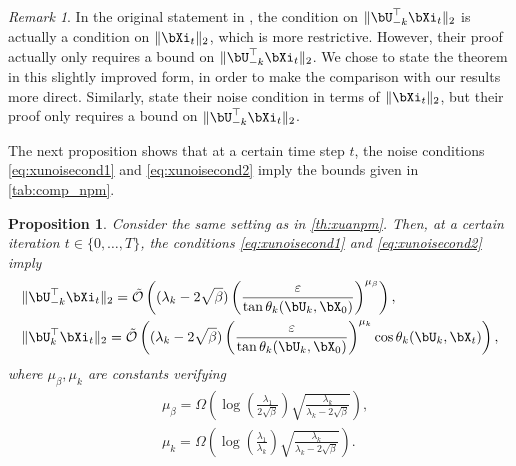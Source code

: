 \documentclass{article}
\theoremstyle{plain}
\newtheorem{proposition}[theorem]{Proposition}
\theoremstyle{definition}
\theoremstyle{remark}
\newtheorem{remark}[theorem]{Remark}
\begin{document}
\begin{remark}
  In the original statement in \cite{xu2023anpm}, the condition on $\Vert \bU_{-k}^\top\bXi_t \Vert_2$ is actually a condition on $\Vert\bXi_t\Vert_2$, which is more restrictive. However, their proof actually only requires a bound on $\Vert \bU_{-k}^\top\bXi_t \Vert_2$. We chose to state the theorem in this slightly improved form, in order to make the comparison with our results more direct. Similarly, \citet{hardt14} state their noise condition in terms of $\Vert \bXi_t \Vert_2$, but their proof only requires a bound on $\Vert \bU_{-k}^\top\bXi_t \Vert_2$.
\end{remark}

The next proposition shows that at a certain time step $t$, the noise conditions \eqref{eq:xunoisecond1} and \eqref{eq:xunoisecond2} imply the bounds given in \cref{tab:comp_npm}.

\begin{proposition}
    Consider the same setting as in \cref{th:xuanpm}. Then, at a certain iteration $t \in \{0,\dots,T\}$, the conditions \eqref{eq:xunoisecond1} and \eqref{eq:xunoisecond2} imply
    \begin{align*}
        & \Vert \bU_{-k}^\top\bXi_t \Vert_2 = \tilde{\mathcal{O}} \left( (\lambda_k - 2\sqrt{\beta}) \left(\frac{\varepsilon}{\tan\theta_k(\bU_k,\bX_0)}\right)^{\mu_\beta} \right) , \\
        & \Vert \bU_k^\top \bXi_t \Vert_2 = \tilde{\mathcal{O}} \left( (\lambda_k - 2\sqrt{\beta}) \left(\frac{\varepsilon}{\tan\theta_k(\bU_k,\bX_0)}\right)^{\mu_k} \cos\theta_k(\bU_k, \bX_t)\right),
    \end{align*}
    where $\mu_\beta, \mu_k$ are constants verifying
    \begin{align*}
        & \mu_\beta = \Omega\left(\log\left(\frac{\lambda_1}{2\sqrt{\beta}}\right)\sqrt{\frac{\lambda_k}{\lambda_k-2\sqrt{\beta}}}\right),\\
        & \mu_k = \Omega\left(\log\left(\frac{\lambda_1}{\lambda_k}\right)\sqrt{\frac{\lambda_k}{\lambda_k-2\sqrt{\beta}}}\right).
    \end{align*}
\end{proposition}
\end{document}
